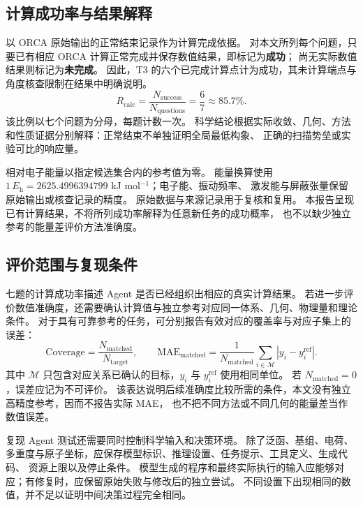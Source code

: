 \documentclass[UTF8,fontset=fandol,a4paper,11pt]{ctexart}
\newcommand{\Eh}{E_{\mathrm h}}
\begin{document}
\subsection{计算成功率与结果解释}
以 ORCA 原始输出的正常结束记录作为计算完成依据。%
对本文所列每个问题，只要已有相应 ORCA 计算正常完成并保存数值结果，即标记为\textbf{成功}；%
尚无实际数值结果则标记为\textbf{未完成}。%
因此，T3 的六个已完成计算点计为成功，其未计算端点与角度核查限制在结果中明确说明。
\begin{equation}
  R_{\mathrm{calc}}=\frac{N_{\mathrm{success}}}{N_{\mathrm{questions}}}
  =\frac{6}{7}\approx85.7\%.
  \label{eq:success-rate}
\end{equation}
该比例以七个问题为分母，每题计数一次。%
科学结论根据实际收敛、几何、方法和性质证据分别解释：正常结束不单独证明全局最低构象、%
正确的扫描势垒或实验可比的响应量。

相对电子能量以指定候选集合内的参考值为零。%
能量换算使用 $1\,\Eh=2625.4996394799$ kJ mol$^{-1}$；电子能、振动频率、%
激发能与屏蔽张量保留原始输出或核查记录的精度。%
原始数据与来源记录用于复核和复用\cite{fair}。%
本报告呈现已有计算结果，不将所列成功率解释为任意新任务的成功概率，%
也不以缺少独立参考的能量差评价方法准确度。

\subsection{评价范围与复现条件}
七题的计算成功率描述 Agent 是否已经组织出相应的真实计算结果。%
若进一步评价数值准确度，还需要确认计算值与独立参考对应同一体系、几何、物理量和理论条件。%
对于具有可靠参考的任务，可分别报告有效对应的覆盖率与对应子集上的误差：
\begin{equation}
  \mathrm{Coverage}=\frac{N_{\mathrm{matched}}}{N_{\mathrm{target}}},
  \qquad
  \mathrm{MAE}_{\mathrm{matched}}=
  \frac{1}{N_{\mathrm{matched}}}\sum_{i\in\mathcal M}|y_i-y_i^{\mathrm{ref}}|.
  \label{eq:coverage-accuracy}
\end{equation}
其中 $\mathcal M$ 只包含对应关系已确认的目标，$y_i$ 与 $y_i^{\mathrm{ref}}$ 使用相同单位。%
若 $N_{\mathrm{matched}}=0$，误差应记为不可评价。%
该表达说明后续准确度比较所需的条件，本文没有独立高精度参考，因而不报告实际 MAE，%
也不把不同方法或不同几何的能量差当作数值误差。

复现 Agent 测试还需要同时控制科学输入和决策环境。%
除了泛函、基组、电荷、多重度与原子坐标，应保存模型标识、推理设置、任务提示、工具定义、生成代码、%
资源上限以及停止条件。%
模型生成的程序和最终实际执行的输入应能够对应；有修复时，应保留原始失败与修改后的独立尝试。%
不同设置下出现相同的数值，并不足以证明中间决策过程完全相同。
\end{document}
